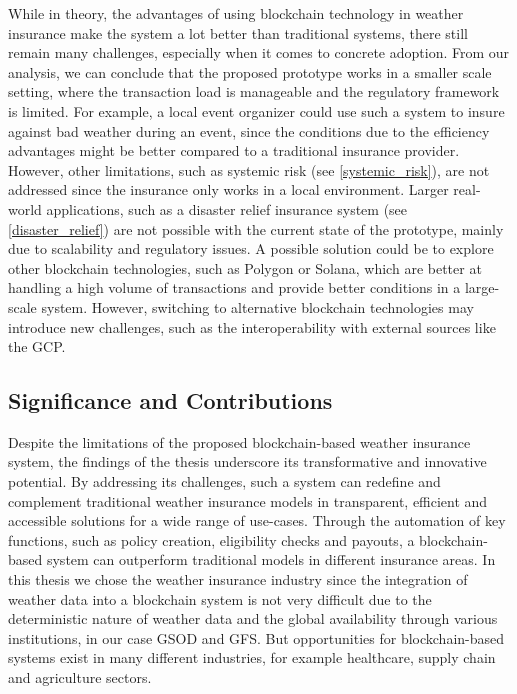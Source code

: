 While in theory, the advantages of using blockchain technology in weather insurance make the system a lot better than traditional systems, there still remain many challenges, especially when it comes to concrete adoption. From our analysis, we can conclude that the proposed prototype works in a smaller scale setting, where the transaction load is manageable and the regulatory framework is limited. For example, a local event organizer could use such a system to insure against bad weather during an event, since the conditions due to the efficiency advantages might be better compared to a traditional insurance provider. However, other limitations, such as systemic risk (see \cref{systemic_risk}), are not addressed since the insurance only works in a local environment. Larger real-world applications, such as a disaster relief insurance system (see \cref{disaster_relief}) are not possible with the current state of the prototype, mainly due to scalability and regulatory issues. A possible solution could be to explore other blockchain technologies, such as Polygon or Solana, which are better at handling a high volume of transactions and provide better conditions in a large-scale system. However, switching to alternative blockchain technologies may introduce new challenges, such as the interoperability with external sources like the GCP.

\subsection{Significance and Contributions}
Despite the limitations of the proposed blockchain-based weather insurance system, the findings of the thesis underscore its transformative and innovative potential. By addressing its challenges, such a system can redefine and complement traditional weather insurance models in transparent, efficient and accessible solutions for a wide range of use-cases. Through the automation of key functions, such as policy creation, eligibility checks and payouts, a blockchain-based system can outperform traditional models in different insurance areas. In this thesis we chose the weather insurance industry since the integration of weather data into a blockchain system is not very difficult due to the deterministic nature of weather data and the global availability through various institutions, in our case GSOD and GFS. But opportunities for blockchain-based systems exist in many different industries, for example healthcare, supply chain and agriculture sectors.

